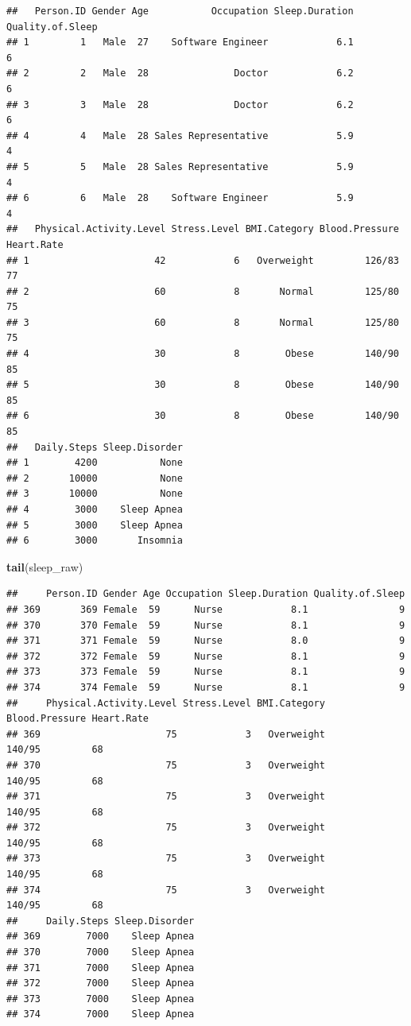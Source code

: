 \documentclass[
]{article}
\newenvironment{Shaded}{\begin{snugshade}}{\end{snugshade}}
\newcommand{\FunctionTok}[1]{\textcolor[rgb]{0.13,0.29,0.53}{\textbf{#1}}}
\newcommand{\NormalTok}[1]{#1}
\begin{document}
\begin{verbatim}
##   Person.ID Gender Age           Occupation Sleep.Duration Quality.of.Sleep
## 1         1   Male  27    Software Engineer            6.1                6
## 2         2   Male  28               Doctor            6.2                6
## 3         3   Male  28               Doctor            6.2                6
## 4         4   Male  28 Sales Representative            5.9                4
## 5         5   Male  28 Sales Representative            5.9                4
## 6         6   Male  28    Software Engineer            5.9                4
##   Physical.Activity.Level Stress.Level BMI.Category Blood.Pressure Heart.Rate
## 1                      42            6   Overweight         126/83         77
## 2                      60            8       Normal         125/80         75
## 3                      60            8       Normal         125/80         75
## 4                      30            8        Obese         140/90         85
## 5                      30            8        Obese         140/90         85
## 6                      30            8        Obese         140/90         85
##   Daily.Steps Sleep.Disorder
## 1        4200           None
## 2       10000           None
## 3       10000           None
## 4        3000    Sleep Apnea
## 5        3000    Sleep Apnea
## 6        3000       Insomnia
\end{verbatim}

\begin{Shaded}
\begin{Highlighting}[]
\FunctionTok{tail}\NormalTok{(sleep\_raw)}
\end{Highlighting}
\end{Shaded}

\begin{verbatim}
##     Person.ID Gender Age Occupation Sleep.Duration Quality.of.Sleep
## 369       369 Female  59      Nurse            8.1                9
## 370       370 Female  59      Nurse            8.1                9
## 371       371 Female  59      Nurse            8.0                9
## 372       372 Female  59      Nurse            8.1                9
## 373       373 Female  59      Nurse            8.1                9
## 374       374 Female  59      Nurse            8.1                9
##     Physical.Activity.Level Stress.Level BMI.Category Blood.Pressure Heart.Rate
## 369                      75            3   Overweight         140/95         68
## 370                      75            3   Overweight         140/95         68
## 371                      75            3   Overweight         140/95         68
## 372                      75            3   Overweight         140/95         68
## 373                      75            3   Overweight         140/95         68
## 374                      75            3   Overweight         140/95         68
##     Daily.Steps Sleep.Disorder
## 369        7000    Sleep Apnea
## 370        7000    Sleep Apnea
## 371        7000    Sleep Apnea
## 372        7000    Sleep Apnea
## 373        7000    Sleep Apnea
## 374        7000    Sleep Apnea
\end{verbatim}
\end{document}

